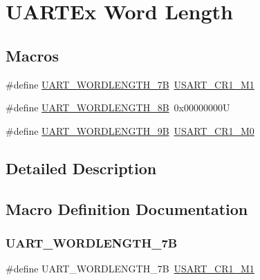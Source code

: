 \hypertarget{group___u_a_r_t_ex___word___length}{}\section{U\+A\+R\+T\+Ex Word Length}
\label{group___u_a_r_t_ex___word___length}
\subsection*{Macros}
\begin{DoxyCompactItemize}
\item 
\#define \mbox{\hyperlink{group___u_a_r_t_ex___word___length_gadaec9a23646032a333a5327d66aae4fe}{U\+A\+R\+T\+\_\+\+W\+O\+R\+D\+L\+E\+N\+G\+T\+H\+\_\+7B}}~\mbox{\hyperlink{group___peripheral___registers___bits___definition_gae19a4c9577dfb1569cf6f564fe6c4949}{U\+S\+A\+R\+T\+\_\+\+C\+R1\+\_\+\+M1}}
\item 
\#define \mbox{\hyperlink{group___u_a_r_t_ex___word___length_gaf394e9abaf17932ee89591f990fe6407}{U\+A\+R\+T\+\_\+\+W\+O\+R\+D\+L\+E\+N\+G\+T\+H\+\_\+8B}}~0x00000000U
\item 
\#define \mbox{\hyperlink{group___u_a_r_t_ex___word___length_gaf867be43de35fd3c32fe0b4dd4058f7e}{U\+A\+R\+T\+\_\+\+W\+O\+R\+D\+L\+E\+N\+G\+T\+H\+\_\+9B}}~\mbox{\hyperlink{group___peripheral___registers___bits___definition_gaaf15ab248c1ff14e344bf95a494c3ad8}{U\+S\+A\+R\+T\+\_\+\+C\+R1\+\_\+\+M0}}
\end{DoxyCompactItemize}


\subsection{Detailed Description}


\subsection{Macro Definition Documentation}
\mbox{\label{group___u_a_r_t_ex___word___length_gadaec9a23646032a333a5327d66aae4fe}} 
\subsubsection{\texorpdfstring{UART\_WORDLENGTH\_7B}{UART\_WORDLENGTH\_7B}}
{\footnotesize\ttfamily \#define U\+A\+R\+T\+\_\+\+W\+O\+R\+D\+L\+E\+N\+G\+T\+H\+\_\+7B~\mbox{\hyperlink{group___peripheral___registers___bits___definition_gae19a4c9577dfb1569cf6f564fe6c4949}{U\+S\+A\+R\+T\+\_\+\+C\+R1\+\_\+\+M1}}}

